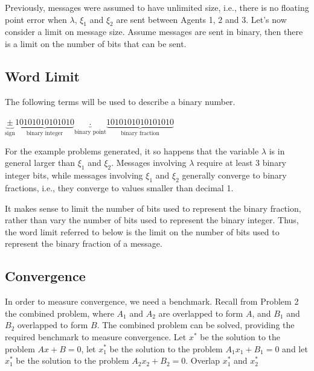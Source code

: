 \documentclass[12pt]{article}
\begin{document}
Previously, messages were assumed to have unlimited size, i.e., there is no floating point error when $\lambda$, $\xi_1$ and $\xi_2$ are sent between Agents 1, 2 and 3. Let's now consider a limit on message size. Assume messages are sent in binary, then there is a limit on the number of bits that can be sent.

\subsection*{Word Limit}

The following terms will be used to describe a binary number.
\begin{center}
	$\underbrace{\pm}_{\text{sign}}\underbrace{10101010101010}_{\text{binary integer}}\underbrace{.}_{\text{binary point}}\underbrace{1010101010101010}_{\text{binary fraction}}$
\end{center}


For the example problems generated, it so happens that the variable $\lambda$ is in general larger than $\xi_1$ and $\xi_2$. Messages involving $\lambda$ require at least 3 binary integer bits, while messages involving $\xi_1$ and $\xi_2$ generally converge to binary fractions, i.e., they converge to values smaller than decimal 1.

It makes sense to limit the number of bits used to represent the binary fraction, rather than vary the number of bits used to represent the binary integer. Thus, the word limit referred to below is the limit on the number of bits used to represent the binary fraction of a message.

\subsection*{Convergence}

In order to measure convergence, we need a benchmark. Recall from Problem 2 the combined problem, where $A_1$ and $A_2$ are overlapped to form $A$, and $B_1$ and $B_2$ overlapped to form $B$. The combined problem can be solved, providing the required benchmark to measure convergence. Let $x^*$ be the solution to the problem $Ax+B=0$, let $x_1^*$ be the solution to the problem $A_1x_1+B_1=0$ and let $x_1^*$ be the solution to the problem $A_2x_2+B_2=0$. Overlap $x_1^*$ and $x_2^*$
\end{document}
